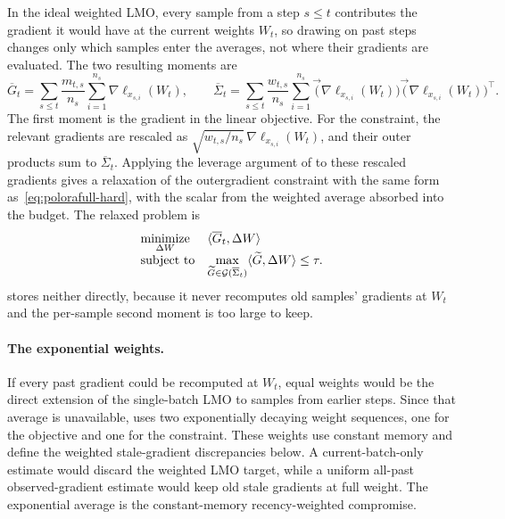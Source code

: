 In the ideal weighted LMO, every sample from a step $s\le t$ contributes
the gradient it would have at the current weights $W_t$, so drawing on past
steps changes only which samples enter the averages, not where their
gradients are evaluated. The two resulting moments are
\[
\overline G_t
  =
  \sum_{s\le t}\frac{m_{t,s}}{n_s}\sum_{i=1}^{n_s}
  \nabla\ell_{x_{s,i}}(W_t),
\qquad
\overline\Sigma_t
  =
  \sum_{s\le t}\frac{w_{t,s}}{n_s}\sum_{i=1}^{n_s}
  \vec(\nabla\ell_{x_{s,i}}(W_t))
  \vec(\nabla\ell_{x_{s,i}}(W_t))^\top .
\]
The first moment is the gradient in the linear objective. For the
constraint, the relevant gradients are rescaled as
$\sqrt{w_{t,s}/n_s}\,\nabla\ell_{x_{s,i}}(W_t)$, and their outer
products sum to $\overline\Sigma_t$. Applying the leverage argument of
 to these rescaled gradients gives a relaxation of
the outergradient constraint with the same form as~\eqref{eq:polorafull-hard},
with the scalar from the weighted average absorbed into the budget. The
relaxed problem is
\begin{equation}\label{eq:weighted-relaxed-03}
 \begin{array}{ll}
  \underset{\Delta W}{\mathrm{minimize}} &
  \langle \overline G_t, \Delta W \rangle \\[2pt]
  \mbox{subject to} &
  \displaystyle
  \max_{\widetilde{G}\in\mathcal{G}(\overline\Sigma_t)}
  \langle \widetilde{G},\Delta W \rangle\le\tau .
  \end{array}
\end{equation}
 stores neither directly, because it never recomputes old
samples' gradients at $W_t$ and the per-sample second moment is too large
to keep.

\paragraph{The exponential weights.}
If every past gradient could be recomputed at $W_t$, equal weights would be
the direct extension of the single-batch LMO to samples from earlier steps.
Since that average is unavailable,  uses two exponentially
decaying weight sequences, one for the objective and one for the constraint.
These weights use constant memory and define the weighted stale-gradient
discrepancies below. A current-batch-only estimate would discard the weighted
LMO target, while a uniform all-past observed-gradient estimate would keep old
stale gradients at full weight. The exponential average is the constant-memory
recency-weighted compromise.

